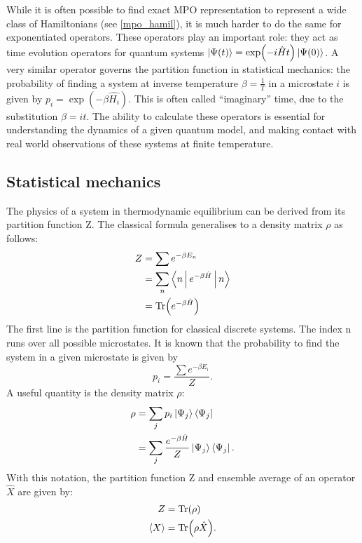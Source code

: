 
While it is often possible to find exact \Gls{MPO} representation to represent a wide class of Hamiltonians (see \cref{mpo_hamil}), it is much harder to do the same for exponentiated operators. These operators play an important role: they act as time evolution operators for quantum systems $ \ket{\Psi(t)} = \exp( -i \hat{H} t ) \ket{\Psi(0)}$. A very similar operator governs the partition function in statistical mechanics: the probability of finding a system at inverse temperature $\beta = \frac{1}{T}$ in a microstate $i$ is given by $p_i = \exp(  - \beta \hat{H_i} )$. This is often called “imaginary” time, due to the substitution $\beta = i t$. The ability to calculate these operators is essential for understanding the dynamics of a given quantum model, and making contact with real world observations of these systems at finite temperature.

\subsection{Statistical mechanics}\label{subsec:statmech}

The physics of a system in thermodynamic equilibrium can be derived from its partition function Z. The classical formula generalises to a density matrix $\rho$ as follows:
\begin{equation}
    \begin{split}
        Z &= \sum e^{ - \beta E_n} \\
        &= \sum_n \Braket{n | e^{ - \beta \hat{H} }  | n} \\
        &= \Tr( e^{ - \beta \hat{H} } )
    \end{split}
\end{equation}
The first line is the partition function for classical discrete systems. The index n runs over all possible microstates. It is known that the probability to find the system in a given microstate is given by
\begin{equation}
    p_i = \frac{\sum e^{ - \beta E_i}}{Z} .
\end{equation}
A useful quantity is the density matrix $\rho$:
\begin{equation}
    \begin{split}
        \rho &= \sum_j p_i  \Ket{ \Psi_j} \Bra{\Psi_j}   \\
        &= \sum_j \frac{ e^{ - \beta \hat{H} } }{Z}  \Ket{ \Psi_j} \Bra{\Psi_j} .
    \end{split}
\end{equation}
With this notation, the partition function Z and ensemble average of an operator $\hat{X}$ are given by:
\begin{equation}
    \begin{split}
        Z &= \Tr( \rho) \\
        \Braket{X} &= \Tr(\rho \hat{X}) .
    \end{split}
\end{equation}


